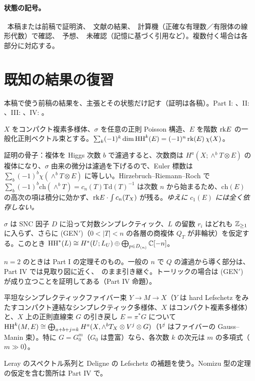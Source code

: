 \paragraph{状態の記号。}\tP\ 本稿または前稿で証明済、\tC\ 文献の結果、\tV\ 計算機（正確な有理数／有限体の線形代数）で確認、\tK\ 予想、\tQ\ 未確認（記憶に基づく引用など）。複数付く場合は各部分に対応する。

\section{既知の結果の復習}\label{sec:recall}
本稿で使う前稿の結果を、主張とその状態だけ記す（証明は各稿）。Part I: \cite{PartI}、II: \cite{PartII}、III: \cite{PartIII}、IV: \cite{PartIV}。

\begin{thm}\label{thm:E}
$X$ をコンパクト複素多様体、$\sigma$ を任意の正則 Poisson 構造、$E$ を階数 $\mathrm{rk} E$ の一般化正則ベクトル束とする。$\sum_k(-1)^k\dim\mathrm{HH}^k(E)=(-1)^n\,\mathrm{rk}(E)\,\chi(X)$。
\end{thm}
証明の骨子：複体を Higgs 次数 $b$ で濾過すると、次数商は $H^a(X;\wedge^bT\otimes E)$ の複体になり、$\sigma$ 由来の微分は濾過を下げるので、Euler 標数は $\sum_b(-1)^b\chi(\wedge^bT\otimes E)$ に等しい。Hirzebruch--Riemann--Roch で $\sum_b(-1)^b\mathrm{ch}(\wedge^bT)=c_n(T)\mathrm{Td}(T)^{-1}$ は次数 $n$ から始まるため、$\mathrm{ch}(E)$ の高次の項は積分に効かず、$\mathrm{rk} E\cdot\int c_n(T_X)$ が残る。\emph{ゆえに $c_1(E)$ には全く依存しない。}

\begin{thm}\label{thm:R}
$\sigma$ は SNC 因子 $D$ に沿って対数シンプレクティック、$L$ の留数 $r_i$ はどれも $\mathbb Z_{\ge1}$ に入らず、さらに (GEN$'$)（$0<|T|<n$ の各層の商複体 $Q_T$ が非輪状）を仮定する。このとき $\mathrm{HH}^*(L)\cong H^*(U;L_U)\oplus\bigoplus_{p\in D_{(n)}}\mathbb C[-n]$。
\end{thm}
$n=2$ のときは Part I の定理そのもの。一般の $n$ で $Q$ の濾過から導く部分は、Part IV では見取り図に近く、\tQ\ のまま引き継ぐ。トーリックの場合は (GEN$'$) が成り立つことを証明してある（Part IV 命題）。

\begin{thm}\label{thm:L}
平坦なシンプレクティックファイバー束 $Y\to M\to X$（$Y$ は hard Lefschetz をみたすコンパクト連結なシンプレクティック多様体、$X$ はコンパクト複素多様体）と、$X$ 上の正則直線束 $G$ の引き戻し $E=\pi^*G$ について $\mathrm{HH}^k(M,E)\cong\bigoplus_{a+b+j=k}H^a(X,\wedge^bT_X\otimes V^j\otimes G)$（$V^j$ はファイバーの Gauss--Manin 束）。特に $G=G_0^m$（$G_0$ は豊富）なら、各次数 $k$ の次元は $m$ の多項式（$m\gg0$）。
\end{thm}
Leray のスペクトル系列と Deligne の Lefschetz の補題を使う。Nomizu 型の定理の仮定を含む箇所は Part IV で\tQ。

